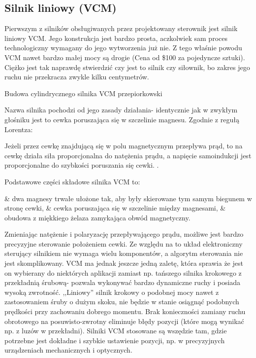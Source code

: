 \subsection{Silnik liniowy (VCM)}

Pierwszym z silników obsługiwanych przez projektowany sterownik jest silnik liniowy VCM. Jego konstrukcja jest bardzo prosta, aczkolwiek sam proces technologiczny wymagany do jego wytworzenia już nie. Z tego właśnie powodu VCM nawet bardzo małej mocy są drogie (Cena od \$100 za pojedyncze sztuki). Ciężko jest tak naprawdę stwierdzić czy jest to silnik czy siłownik, bo zakres jego ruchu nie przekracza zwykle kilku centymetrów.

	{Budowa cylindrycznego silnika VCM}
	{przepiorkowski}

Nazwa silnika pochodzi od jego zasady działania- identycznie jak w zwykłym głośniku jest to cewka poruszająca się w szczelinie magnesu. Zgodnie z regułą Lorentza:

\begin{defn}
	Jeżeli przez cewkę znajdującą się w polu magnetycznym przepływa prąd, to na cewkę działa siła proporcjonalna do natężenia prądu, a napięcie samoindukcji jest proporcjonalne do szybkości poruszania się cewki. \cite{przepiorkowski}.
\end{defn}

Podstawowe części składowe silnika VCM to:
\begin{easylist}
	& dwa magnesy trwałe ułożone tak, aby były skierowane tym samym biegunem w stronę cewki,
	& cewka poruszająca się w szczelinie między magnesami,
	& obudowa z miękkiego żelaza zamykająca obwód magnetyczny.
	\\
\end{easylist}

Zmieniając natężenie i polaryzację przepływającego prądu, możliwe jest bardzo precyzyjne sterowanie położeniem cewki. Ze względu na to układ elektroniczny sterujący silnikiem nie wymaga wielu komponentów, a algorytm sterowania nie jest skomplikowany. VCM ma jednak jeszcze jedną zaletę, która sprawia że jest on wybierany do niektórych aplikacji zamiast np. tańszego silnika krokowego z przekładnią śrubową- pozwala wykonywać bardzo dynamiczne ruchy i posiada wysoką zwrotność. ,,Liniowy'' silnik krokowy o podobnej mocy nawet z zastosowaniem śruby o dużym skoku, nie będzie w stanie osiągnąć podobnych prędkości przy zachowaniu dobrego momentu. Brak konieczności zamiany ruchu obrotowego na posuwisto-zwrotny eliminuje błędy pozycji (które mogą wynikać np. z luzów w przekładni). Silniki VCM stosowane są wszędzie tam, gdzie potrzebne jest dokładne i szybkie ustawienie pozycji, np. w precyzyjnych urządzeniach mechanicznych i optycznych. \\


